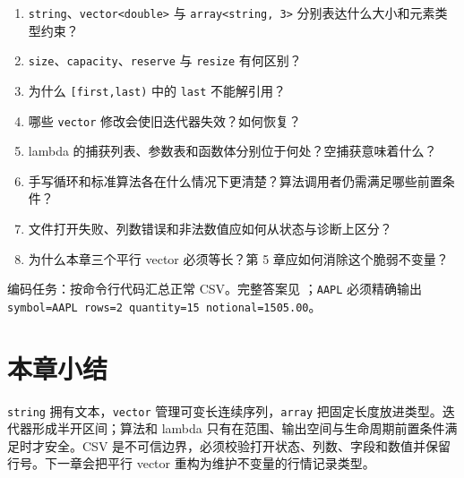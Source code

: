 \begin{enumerate}
  \item \texttt{string}、\texttt{vector<double>} 与 \texttt{array<string, 3>} 分别表达什么大小和元素类型约束？
  \item \texttt{size}、\texttt{capacity}、\texttt{reserve} 与 \texttt{resize} 有何区别？
  \item 为什么 \texttt{[first,last)} 中的 \texttt{last} 不能解引用？
  \item 哪些 \texttt{vector} 修改会使旧迭代器失效？如何恢复？
  \item lambda 的捕获列表、参数表和函数体分别位于何处？空捕获意味着什么？
  \item 手写循环和标准算法各在什么情况下更清楚？算法调用者仍需满足哪些前置条件？
  \item 文件打开失败、列数错误和非法数值应如何从状态与诊断上区分？
  \item 为什么本章三个平行 vector 必须等长？第 5 章应如何消除这个脆弱不变量？
\end{enumerate}

编码任务：按命令行代码汇总正常 CSV。完整答案见 ；\texttt{AAPL} 必须精确输出 \texttt{symbol=AAPL rows=2 quantity=15 notional=1505.00}。


\section{本章小结}

\texttt{string} 拥有文本，\texttt{vector} 管理可变长连续序列，\texttt{array} 把固定长度放进类型。迭代器形成半开区间；算法和 lambda 只有在范围、输出空间与生命周期前置条件满足时才安全。CSV 是不可信边界，必须校验打开状态、列数、字段和数值并保留行号。下一章会把平行 vector 重构为维护不变量的行情记录类型。
